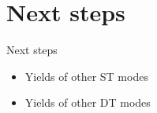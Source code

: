 \documentclass{beamer}
\begin{document}
\section{Next steps}
\begin{frame}{Next steps}
  \begin{itemize}
    \setlength\itemsep{2em}
    \item{Yields of other ST modes}
    \item{Yields of other DT modes}
  \end{itemize}
\end{frame}
\end{document}
